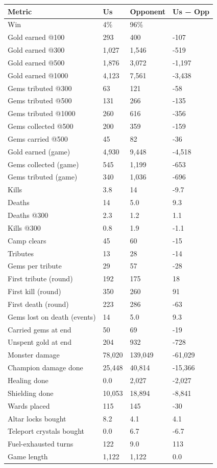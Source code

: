 \documentclass[
  10pt,
]{article}
\newcounter{none} %
\begin{document}
{\def\LTcaptype{none} %
\begin{longtable}[]{@{}llll@{}}
\toprule\noalign{}
Metric & Us & Opponent & Us − Opp \\
\midrule\noalign{}
\endhead
\bottomrule\noalign{}
\endlastfoot
Win & 4\% & 96\% & \\
Gold earned @100 & 293 & 400 & -107 \\
Gold earned @300 & 1,027 & 1,546 & -519 \\
Gold earned @500 & 1,876 & 3,072 & -1,197 \\
Gold earned @1000 & 4,123 & 7,561 & -3,438 \\
Gems tributed @300 & 63 & 121 & -58 \\
Gems tributed @500 & 131 & 266 & -135 \\
Gems tributed @1000 & 260 & 616 & -356 \\
Gems collected @500 & 200 & 359 & -159 \\
Gems carried @500 & 45 & 82 & -36 \\
Gold earned (game) & 4,930 & 9,448 & -4,518 \\
Gems collected (game) & 545 & 1,199 & -653 \\
Gems tributed (game) & 340 & 1,036 & -696 \\
Kills & 3.8 & 14 & -9.7 \\
Deaths & 14 & 5.0 & 9.3 \\
Deaths @300 & 2.3 & 1.2 & 1.1 \\
Kills @300 & 0.8 & 1.9 & -1.1 \\
Camp clears & 45 & 60 & -15 \\
Tributes & 13 & 28 & -14 \\
Gems per tribute & 29 & 57 & -28 \\
First tribute (round) & 192 & 175 & 18 \\
First kill (round) & 350 & 260 & 91 \\
First death (round) & 223 & 286 & -63 \\
Gems lost on death (events) & 14 & 5.0 & 9.3 \\
Carried gems at end & 50 & 69 & -19 \\
Unspent gold at end & 204 & 932 & -728 \\
Monster damage & 78,020 & 139,049 & -61,029 \\
Champion damage done & 25,448 & 40,814 & -15,366 \\
Healing done & 0.0 & 2,027 & -2,027 \\
Shielding done & 10,053 & 18,894 & -8,841 \\
Wards placed & 115 & 145 & -30 \\
Altar locks bought & 8.2 & 4.1 & 4.1 \\
Teleport crystals bought & 0.0 & 6.7 & -6.7 \\
Fuel-exhausted turns & 122 & 9.0 & 113 \\
Game length & 1,122 & 1,122 & 0.0 \\
\end{longtable}
}
\end{document}
